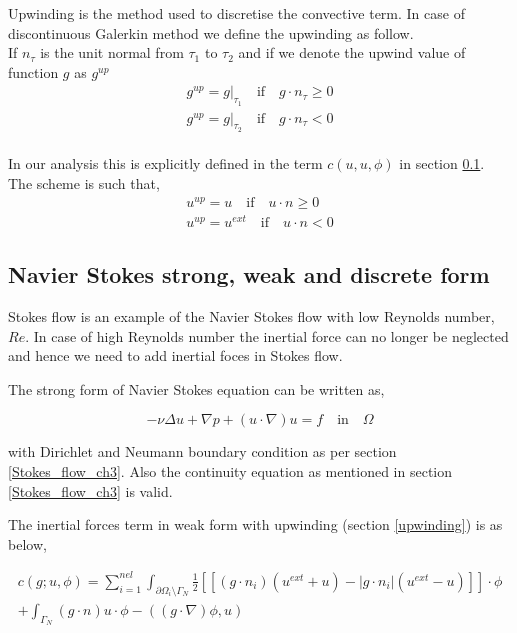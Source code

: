 \documentclass[a4paper,12pt]{book}
\begin{document}
Upwinding is the method used to discretise the convective term. In case of discontinuous Galerkin method we define the upwinding as follow.\\

If $n_\tau$ is the unit normal from $\tau_1$ to $\tau_2$ and if we denote the upwind value of function $g$ as $g^{up}$ \cite{riviere}
\begin{equation}
\begin{split}
g^{up} = g|_{\tau_1} \quad \textrm{if} \quad g \cdot n_\tau \geq 0 \\
g^{up} = g|_{\tau_2} \quad \textrm{if} \quad g \cdot n_\tau < 0
\end{split}
\end{equation}
\\
In our analysis this is explicitly defined in the term $c(u,u,\phi)$ in section \ref{n_s_ch3}. The scheme is such that,
\begin{equation}
\begin{split}
u^{up} = u \quad \textrm{if} \quad u \cdot n \geq 0 \\
u^{up} = u^{ext} \quad \textrm{if} \quad u \cdot n < 0
\end{split}
\end{equation}

\subsection{Navier Stokes strong, weak and discrete form} \label{n_s_ch3}

Stokes flow is an example of the Navier Stokes flow with low Reynolds number, $Re$. In case of high Reynolds number the inertial force can no longer be neglected and hence we need to add inertial foces in Stokes flow. 

The strong form of Navier Stokes equation can be written as,

\begin{equation} \label{navier_stokes_strong_ch3}
-\nu \Delta u + \nabla p + (u \cdot \nabla) u = f \quad \textrm{in} \quad \Omega
\end{equation}

with Dirichlet and Neumann boundary condition as per section \ref{Stokes_flow_ch3}. Also the continuity equation as mentioned in section \ref{Stokes_flow_ch3} is valid.

The inertial forces term in weak form with upwinding (section \ref{upwinding}) is as below,

\begin{equation}
\begin{split}
c(g;u,\phi) = \sum_{i=1}^{nel} \int_{\partial \Omega_i \setminus \Gamma_N} \frac{1}{2} [[(g \cdot n_i)(u^{ext} + u) - |g \cdot n_i|(u^{ext} - u)]] \cdot \phi \\ + \int_{\Gamma_N} (g\cdot n) u \cdot \phi -((g\cdot \nabla)\phi,u)
\end{split}
\end{equation}
\end{document}
